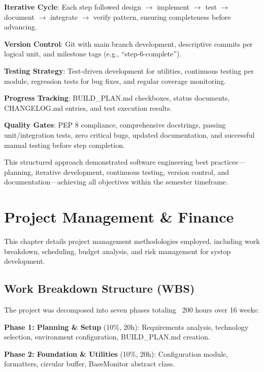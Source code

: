 \documentclass[12pt,a4paper,oneside]{report}
\begin{document}
\textbf{Iterative Cycle}: Each step followed design $\rightarrow$ implement $\rightarrow$ test $\rightarrow$ document $\rightarrow$ integrate $\rightarrow$ verify pattern, ensuring completeness before advancing.

\textbf{Version Control}: Git with main branch development, descriptive commits per logical unit, and milestone tags (e.g., ``step-6-complete'').

\textbf{Testing Strategy}: Test-driven development for utilities, continuous testing per module, regression tests for bug fixes, and regular coverage monitoring.

\textbf{Progress Tracking}: BUILD\_PLAN.md checkboxes, status documents, CHANGELOG.md entries, and test execution results.

\textbf{Quality Gates}: PEP 8 compliance, comprehensive docstrings, passing unit/integration tests, zero critical bugs, updated documentation, and successful manual testing before step completion.

This structured approach demonstrated software engineering best practices---planning, iterative development, continuous testing, version control, and documentation---achieving all objectives within the semester timeframe.

\chapter{Project Management \& Finance}
\label{chap:management}

This chapter details project management methodologies employed, including work breakdown, scheduling, budget analysis, and risk management for systop development.

\section{Work Breakdown Structure (WBS)}
\label{sec:wbs}

The project was decomposed into seven phases totaling ~200 hours over 16 weeks:

\textbf{Phase 1: Planning \& Setup} (10\%, 20h): Requirements analysis, technology selection, environment configuration, BUILD\_PLAN.md creation.

\textbf{Phase 2: Foundation \& Utilities} (10\%, 20h): Configuration module, formatters, circular buffer, BaseMonitor abstract class.
\end{document}
